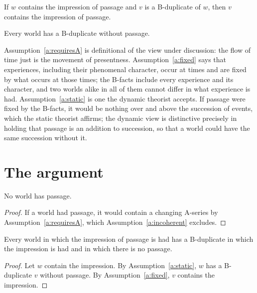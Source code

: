 \documentclass{situationist-preprint}
\begin{document}
\begin{assumption}\label{a:fixed}
If $w$ contains the impression of passage and $v$ is a B-duplicate of $w$, then $v$ contains the impression of passage.
\end{assumption}

\begin{assumption}\label{a:static}
Every world has a B-duplicate without passage.
\end{assumption}

Assumption~\ref{a:requiresA} is definitional of the view under discussion: the flow of time just is the movement of presentness. Assumption~\ref{a:fixed} says that experiences, including their phenomenal character, occur at times and are fixed by what occurs at those times; the B-facts include every experience and its character, and two worlds alike in all of them cannot differ in what experience is had. Assumption~\ref{a:static} is one the dynamic theorist accepts. If passage were fixed by the B-facts, it would be nothing over and above the succession of events, which the static theorist affirms; the dynamic view is distinctive precisely in holding that passage is an addition to succession, so that a world could have the same succession without it.

\section{The argument}

\begin{lemma}\label{l:nopass}
No world has passage.
\end{lemma}

\begin{proof}
If a world had passage, it would contain a changing A-series by Assumption~\ref{a:requiresA}, which Assumption~\ref{a:incoherent} excludes.
\end{proof}

\begin{theorem}[Independence]\label{t:indep}
Every world in which the impression of passage is had has a B-duplicate in which the impression is had and in which there is no passage.
\end{theorem}

\begin{proof}
Let $w$ contain the impression. By Assumption~\ref{a:static}, $w$ has a B-duplicate $v$ without passage. By Assumption~\ref{a:fixed}, $v$ contains the impression.
\end{proof}
\end{document}
